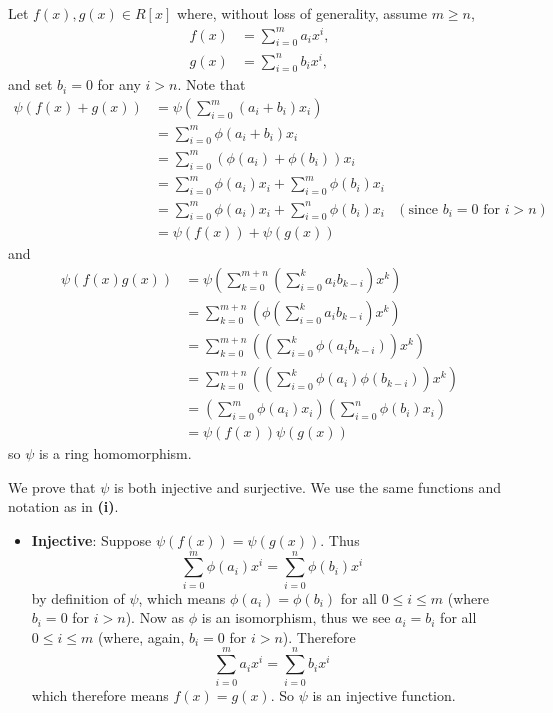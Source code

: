 \begin{questions}
    \item \begin{partquestions}{\roman*}
        \item Let $f(x), g(x) \in R[x]$ where, without loss of generality, assume $m \geq n$,
        \begin{align*}
            f(x) &= \sum_{i=0}^m a_ix^i,\\
            g(x) &= \sum_{i=0}^n b_ix^i,
        \end{align*}
        and set $b_i = 0$ for any $i > n$. Note that
        \begin{align*}
            \psi(f(x) + g(x)) &= \psi\left(\sum_{i=0}^m(a_i+b_i)x_i\right)\\
            &= \sum_{i=0}^m\phi(a_i + b_i)x_i\\
            &= \sum_{i=0}^m\left(\phi(a_i) + \phi(b_i)\right)x_i\\
            &= \sum_{i=0}^m\phi(a_i)x_i + \sum_{i=0}^m\phi(b_i)x_i\\
            &= \sum_{i=0}^m\phi(a_i)x_i + \sum_{i=0}^n\phi(b_i)x_i & (\text{since } b_i = 0 \text{ for } i > n)\\
            &= \psi(f(x)) + \psi(g(x))
        \end{align*}
        and
        \begin{align*}
            \psi(f(x)g(x)) &= \psi\left(\sum_{k=0}^{m+n}\left(\sum_{i=0}^ka_ib_{k-i}\right)x^k\right)\\
            &= \sum_{k=0}^{m+n}\left(\phi\left(\sum_{i=0}^ka_ib_{k-i}\right)x^k\right)\\
            &= \sum_{k=0}^{m+n}\left(\left(\sum_{i=0}^k\phi(a_ib_{k-i})\right)x^k\right)\\
            &= \sum_{k=0}^{m+n}\left(\left(\sum_{i=0}^k\phi(a_i)\phi(b_{k-i})\right)x^k\right)\\
            &= \left(\sum_{i=0}^m\phi(a_i)x_i\right)\left(\sum_{i=0}^n\phi(b_i)x_i\right)\\
            &= \psi(f(x))\psi(g(x))
        \end{align*}
        so $\psi$ is a ring homomorphism.

        \item We prove that $\psi$ is both injective and surjective. We use the same functions and notation as in \textbf{(i)}.
        \begin{itemize}
            \item \textbf{Injective}: Suppose $\psi(f(x)) = \psi(g(x))$. Thus
            \[
                \sum_{i=0}^m \phi(a_i)x^i = \sum_{i=0}^n \phi(b_i)x^i
            \]
            by definition of $\psi$, which means $\phi(a_i) = \phi(b_i)$ for all $0 \leq i \leq m$ (where $b_i = 0$ for $i > n$). Now as $\phi$ is an isomorphism, thus we see $a_i = b_i$ for all $0 \leq i \leq m$ (where, again, $b_i = 0$ for $i > n$). Therefore
            \[
                \sum_{i=0}^m a_ix^i = \sum_{i=0}^n b_ix^i
            \]
            which therefore means $f(x) = g(x)$. So $\psi$ is an injective function.
            

\end{itemize}
\end{partquestions}
\end{questions}
